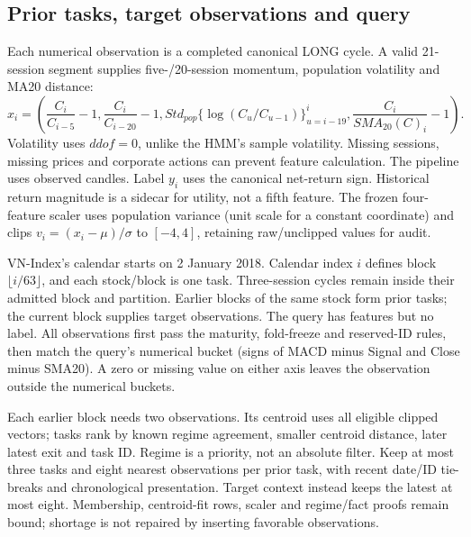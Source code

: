 \subsection{Prior tasks, target observations and query}\label{s:673616bb765d15ae}
Each numerical observation is a completed canonical LONG cycle. A valid
21-session segment supplies five-/20-session momentum, population
volatility and MA20 distance:
\begin{equation}
x_i=\left(\frac{C_i}{C_{i-5}}-1,\frac{C_i}{C_{i-20}}-1,
Std_{pop}\{\log(C_u/C_{u-1})\}_{u=i-19}^{i},
\frac{C_i}{SMA_{20}(C)_i}-1\right).
\end{equation}
Volatility uses $ddof=0$, unlike the HMM's sample volatility. Missing sessions, missing prices and corporate actions can prevent
feature calculation. The pipeline uses observed candles. Label $y_i$ uses the
canonical net-return sign. Historical return magnitude is a sidecar for
utility, not a fifth feature. The frozen four-feature scaler uses
population variance (unit scale for a constant coordinate) and clips
$v_i=(x_i-\mu)/\sigma$ to $[-4,4]$, retaining raw/unclipped values for audit.

VN-Index's calendar starts on 2 January 2018. Calendar index $i$ defines
block $\lfloor i/63\rfloor$, and each stock/block is one task. Three-session
cycles remain inside their admitted block and partition. Earlier blocks
of the same stock form prior tasks; the current block supplies target
observations. The query has features but no label. All observations first
pass the maturity, fold-freeze and reserved-ID rules, then match the
query's numerical bucket (signs of MACD minus Signal and Close minus
SMA20). A zero or missing value on either axis leaves the observation outside the numerical buckets.

Each earlier block needs two observations. Its centroid uses all eligible
clipped vectors; tasks rank by known regime agreement, smaller centroid
distance, later latest exit and task ID. Regime is a priority, not an
absolute filter. Keep at most three tasks and eight nearest observations
per prior task, with recent date/ID tie-breaks and chronological
presentation. Target context instead keeps the latest at most eight.
Membership, centroid-fit rows, scaler and regime/fact proofs remain
bound; shortage is not repaired by inserting favorable observations.

